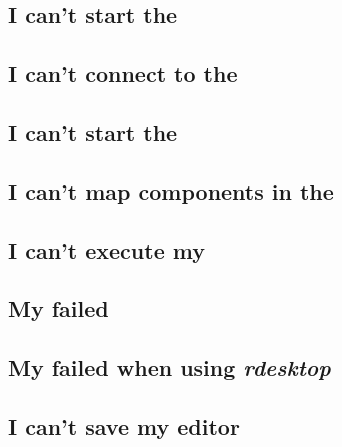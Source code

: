 



\subsection{I can't start the \gdagent}
\label{troublestartserver}


\subsection{I can't connect to the \gdagent}
\label{troubleconnectserver}


\subsection{I can't start the \gdaut{}}
\label{troublestartaut}


\subsection{I can't map components in the \gdomm}
\label{troubleobjectmapping}


\subsection{I can't execute my \gdsuite{}}
\label{troubleexecute}


\subsection{My \gdsuite{} failed}
\label{troublefailed}


\subsection{My \gdsuite{} failed when using \emph{rdesktop}}
\label{troublerdesktop}


\subsection{I can't save my editor}
\label{troublelocked}




